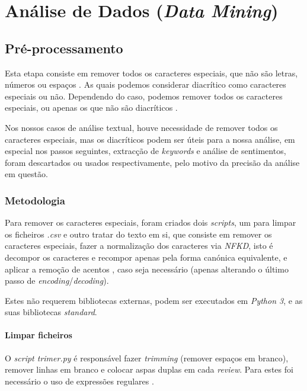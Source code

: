 \chapter{Análise de Dados (\textit{Data Mining})}
\label{cap4}

\section{Pré-processamento}

Esta etapa consiste em remover todos os caracteres especiais, que não são letras, números ou espaços \cite{u1}. As quais podemos considerar diacrítico como caracteres especiais ou não. Dependendo do caso, podemos remover todos os caracteres especiais, ou apenas os que não são diacríticos \cite{cr1}.

Nos nossos casos de análise textual, houve necessidade de remover todos os caracteres especiais, mas os diacríticos podem ser úteis para a nossa análise, em especial nos passos seguintes, extracção de \textit{keywords} e análise de sentimentos, foram descartados ou usados respectivamente, pelo motivo da precisão da análise em questão.

\subsection{Metodologia}

Para remover os caracteres especiais, foram criados dois \textit{scripts}, um para limpar os ficheiros \textit{.csv} e outro tratar do texto em si, que consiste em remover os caracteres especiais, fazer a normalização dos caracteres via \textit{NFKD}\cite{nfkd1}, isto é decompor os caracteres e recompor apenas pela forma canónica equivalente, e aplicar a remoção de acentos \cite{cr1}, caso seja necessário (apenas alterando o último passo de \textit{encoding}/\textit{decoding}).

Estes não requerem bibliotecas externas, podem ser executados em \textit{Python 3}, e as suas bibliotecas \textit{standard}.

\subsubsection{Limpar ficheiros}

O \textit{script trimer.py} é responsável fazer \textit{trimming} (remover espaços em branco), remover linhas em branco e colocar aspas duplas em cada \textit{review}. Para estes foi necessário o uso de expressões regulares \cite{u1}.


